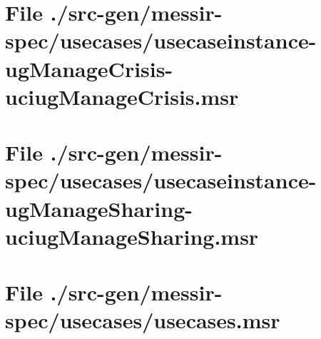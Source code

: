 \section[File /src-gen.../usecaseinstance-ugManageCrisis-uciugManageCrisis.msr]{File ./src-gen/messir-spec/usecases/usecaseinstance-ugManageCrisis-uciugManageCrisis.msr}
\scriptsize

\normalsize
	
\section[File /src-gen.../usecaseinstance-ugManageSharing-uciugManageSharing.msr]{File ./src-gen/messir-spec/usecases/usecaseinstance-ugManageSharing-uciugManageSharing.msr}
\scriptsize

\normalsize
	
\section[File /src-gen/messir-spec/usecases/usecases.msr]{File ./src-gen/messir-spec/usecases/usecases.msr}
\scriptsize

\normalsize
	
